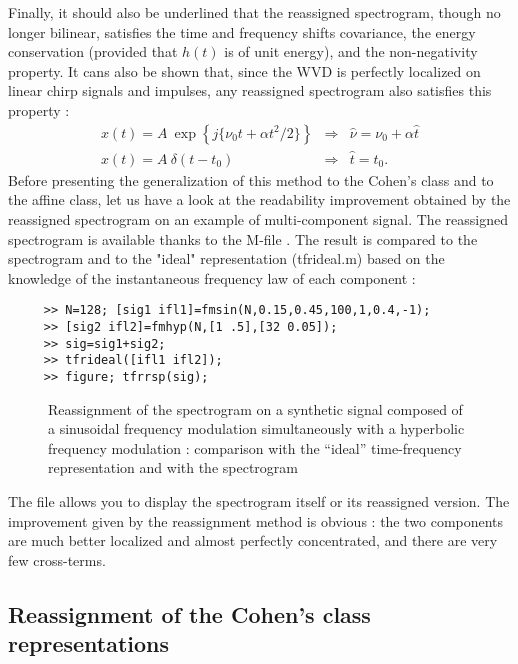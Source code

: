   Finally, it should also be underlined that the reassigned spectrogram,
though no longer bilinear, satisfies the time and frequency shifts
covariance, the energy conservation (provided that $h(t)$ is of unit
energy), and the non-negativity property. It cans also be shown that, since
the WVD is perfectly localized on linear chirp signals and impulses, any
reassigned spectrogram also satisfies this property :
\begin{eqnarray*}
x(t)=A\ \exp\left\{j\{\nu_0 t+\alpha
t^2/2\}\right\}&\Rightarrow&\hat{\nu}=\nu_0+\alpha\hat{t}\\ 
x(t)=A\ \delta(t-t_0)&\Rightarrow&\hat{t}=t_0.
\end{eqnarray*}
  Before presenting the generalization of this method to the Cohen's class
and to the affine class, let us have a look at the readability improvement
obtained by the reassigned spectrogram on an example of multi-component
signal. The reassigned spectrogram is available thanks to the M-file
. The result is compared to the
spectrogram and to the "ideal" representation ({\ttfamily tfrideal.m}) based on the knowledge of the
instantaneous frequency law of each component :
\begin{verbatim}
     >> N=128; [sig1 ifl1]=fmsin(N,0.15,0.45,100,1,0.4,-1);
     >> [sig2 ifl2]=fmhyp(N,[1 .5],[32 0.05]);
     >> sig=sig1+sig2;
     >> tfrideal([ifl1 ifl2]);
     >> figure; tfrrsp(sig);
\end{verbatim}
\begin{figure}[htb]
\epsfxsize=12cm
\epsfysize=8cm
\centerline{}
\caption{\label{Re1fig1}Reassignment of the spectrogram on a synthetic
signal composed of a sinusoidal frequency modulation simultaneously with a
hyperbolic frequency modulation : comparison with the ``ideal''
time-frequency representation and with the spectrogram}
\end{figure}

The file  allows you to display
the spectrogram itself or its reassigned version. The improvement given by
the reassignment method is obvious : the two components are much better
localized and almost perfectly concentrated, and there are very few
cross-terms.


\subsection{Reassignment of the Cohen's class representations}

